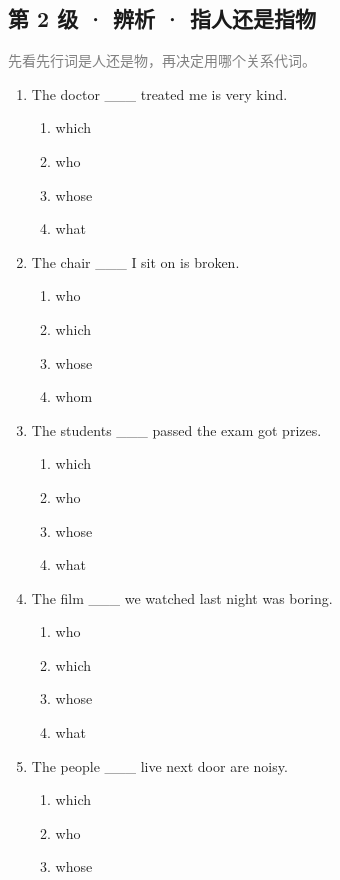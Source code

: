\documentclass[11pt,a4paper]{ctexart}
\begin{document}
\subsection*{第 2 级 · 辨析 · 指人还是指物}
\noindent\textcolor{gray}{先看先行词是人还是物，再决定用哪个关系代词。}\par\smallskip
\begin{enumerate}[leftmargin=*,itemsep=4pt]
\item The doctor \_\_\_ treated me is very kind.
\begin{enumerate}[label=\Alph*.,leftmargin=2em,itemsep=1pt,topsep=2pt]
\item which
\item who
\item whose
\item what
\end{enumerate}
\item The chair \_\_\_ I sit on is broken.
\begin{enumerate}[label=\Alph*.,leftmargin=2em,itemsep=1pt,topsep=2pt]
\item who
\item which
\item whose
\item whom
\end{enumerate}
\item The students \_\_\_ passed the exam got prizes.
\begin{enumerate}[label=\Alph*.,leftmargin=2em,itemsep=1pt,topsep=2pt]
\item which
\item who
\item whose
\item what
\end{enumerate}
\item The film \_\_\_ we watched last night was boring.
\begin{enumerate}[label=\Alph*.,leftmargin=2em,itemsep=1pt,topsep=2pt]
\item who
\item which
\item whose
\item what
\end{enumerate}
\item The people \_\_\_ live next door are noisy.
\begin{enumerate}[label=\Alph*.,leftmargin=2em,itemsep=1pt,topsep=2pt]
\item which
\item who
\item whose

\end{enumerate}
\end{enumerate}
\end{document}
